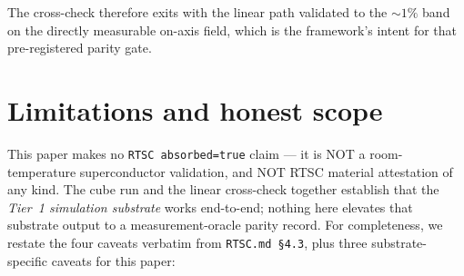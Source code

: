 \documentclass[11pt,a4paper]{article}
\begin{document}
The cross-check therefore exits with the linear path validated to
the $\sim 1\%$ band on the directly measurable on-axis field, which
is the framework's intent for that pre-registered parity gate.

\section{Limitations and honest scope}
\label{sec:limits}

This paper makes no \texttt{RTSC absorbed=true} claim --- it is
NOT a room-temperature superconductor validation, and NOT RTSC
material attestation of any kind. The cube run and the linear
cross-check together establish that the \emph{Tier~1 simulation
substrate} works end-to-end; nothing here elevates that substrate
output to a measurement-oracle parity record.
For completeness, we restate the four caveats verbatim from
\texttt{RTSC.md \S4.3}, plus three substrate-specific caveats for
this paper:
\end{document}
